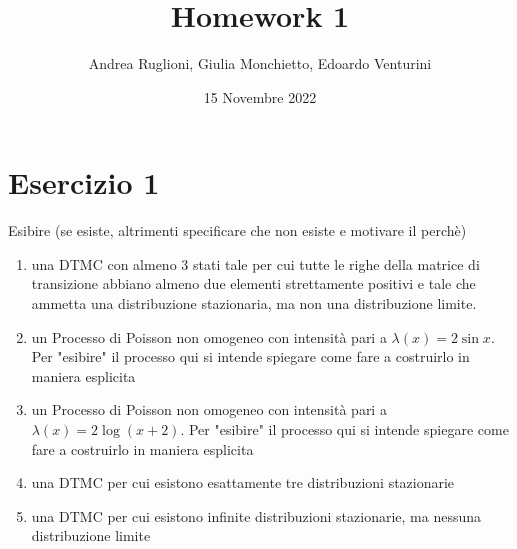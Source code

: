 \documentclass[
	12pt, %
]{fphw}
\title{Homework 1} %
\author{Andrea Ruglioni, Giulia Monchietto, Edoardo Venturini} %
\date{15 Novembre 2022} %
\institute{Politecnico di Torino} %
\begin{document}
\maketitle %

\section*{Esercizio 1}
\begin{problem}
	\smallskip
	Esibire (se esiste, altrimenti specificare che non esiste e motivare il perchè)
	\begin{enumerate}
		\item una DTMC con almeno 3 stati tale per cui tutte le righe della
		matrice di transizione abbiano almeno due elementi strettamente positivi e tale che ammetta una distribuzione stazionaria,
		ma non una distribuzione limite.
		\item un Processo di Poisson non omogeneo con intensità pari a $\lambda(x) = 2\sin x$. Per "esibire" il processo qui si intende spiegare come fare
		a costruirlo in maniera esplicita
		\item un Processo di Poisson non omogeneo con intensità pari a $\lambda(x) = 2\log (x+2)$. Per "esibire" il processo qui si intende spiegare come fare
		a costruirlo in maniera esplicita
		\item una DTMC per cui esistono esattamente tre distribuzioni stazionarie
		\item una DTMC per cui esistono infinite distribuzioni stazionarie,
		ma nessuna distribuzione limite		
	\end{enumerate}
	\smallskip
\end{problem}
\end{document}
